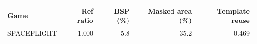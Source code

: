 \begin{tabular}{@{}lrrrr@{}}
\toprule
\textbf{Game} & \textbf{Ref ratio} & \textbf{BSP} (\%) & \textbf{Masked area} (\%) & \textbf{Template reuse} \\
\midrule
SPACEFLIGHT & 1.000 & 5.8 & 35.2 & 0.469 \\
\bottomrule
\end{tabular}
